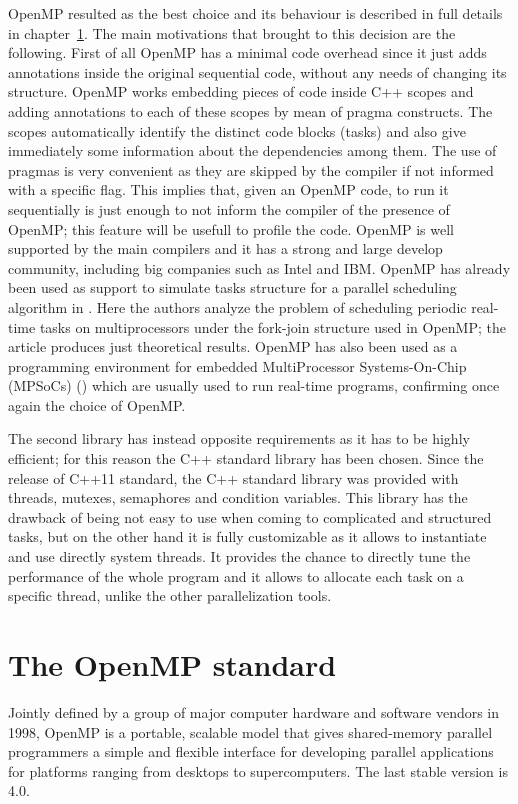 \documentclass[a4paper,12pt,oneside]{book}
\begin{document}
OpenMP resulted as the best choice and its behaviour is described in full details in chapter~\ref{openmp}. The main motivations that brought to this decision are the following. First of all  OpenMP has a minimal code overhead since it just adds annotations inside the original sequential code, without any needs of changing its structure.  OpenMP works embedding pieces of code inside C++ scopes and adding annotations to each of these scopes by mean of pragma constructs. The scopes automatically identify the distinct code blocks (tasks) and also give immediately some information about the dependencies among them. The use of pragmas is very convenient as they are skipped by the compiler if not informed with a specific flag. This implies that, given an  OpenMP code, to run it sequentially is just enough to not inform the compiler of the presence of  OpenMP; this feature will be usefull to profile the code.  OpenMP is well supported by the main compilers and it has a strong and large develop community, including big companies such as Intel and IBM. OpenMP has already been used as support to simulate tasks structure for a parallel scheduling algorithm in \cite{realtimeopenmp}. Here the authors analyze the problem of scheduling periodic real-time tasks on multiprocessors under the fork-join structure used in OpenMP; the article produces just theoretical results. OpenMP has also been used as a programming environment for embedded MultiProcessor Systems-On-Chip (MPSoCs) (\cite{benini}) which are usually used to run real-time programs, confirming once again the choice of OpenMP. 

The second library has instead opposite requirements as it has to be highly efficient; for this reason the C++ standard library has been chosen. Since the release of C++11 standard, the C++ standard library was provided with threads, mutexes, semaphores and condition variables. This library has the drawback of being not easy to use when coming to complicated and structured tasks, but on the other hand it is fully customizable as it allows to instantiate and use directly system threads. It provides the chance to directly tune the performance of the whole program and it allows to allocate each task on a specific thread, unlike the other parallelization tools.

\section{The OpenMP standard}
\label{openmp}

Jointly defined by a group of major computer hardware and software vendors in 1998, OpenMP is a portable, scalable model that gives shared-memory parallel programmers a simple and flexible interface for developing parallel applications for platforms ranging from desktops to supercomputers. The last stable version is 4.0.
\end{document}

